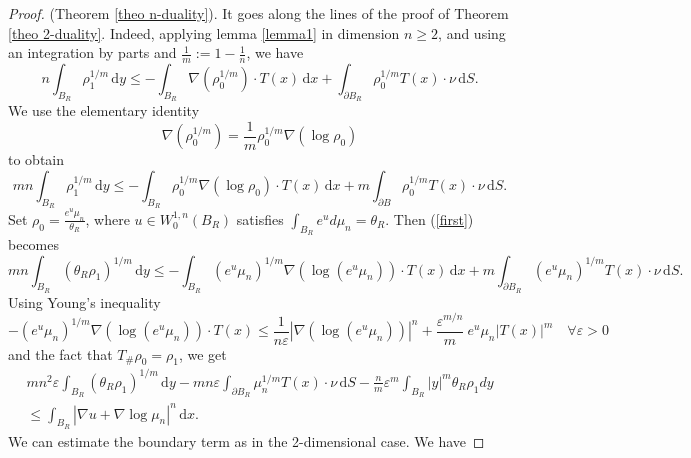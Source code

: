 \documentclass[10pt]{article}
\numberwithin{equation}{section}
\theoremstyle{plain}
\theoremstyle{definition}
\theoremstyle{remark}
\newcommand{\ib}{\int_{B_R}}
\newcommand\vep{\varepsilon}
\newcommand\dd{\,\mbox{d} }
\begin{document}
\begin{proof} (Theorem \ref{theo n-duality}). It goes along the lines of the proof of Theorem  \ref{theo 2-duality}. Indeed, applying lemma \ref{lemma1}  in dimension $n\geq 2$, and using an integration by parts and $\frac{1}{m}:=1-\frac{1}{n}$, we have
\[n\ib \rho_1 ^{1/m} \dd y \leq - \ib \nabla(\rho_0 ^{1/m}) \cdot T(x) \dd x +  \int_{\partial B_R} \rho_0 ^{1/m} T(x)\cdot\nu \dd S.\]
We use the elementary identity  
\[\nabla (\rho_0 ^{1/m})= \frac{1}{m} \rho_0 ^ {1/m} \nabla (\log \rho_0)\]
to obtain
\begin{equation}\label{first}
mn \ib \rho_1 ^{1/m}\dd y \leq - \ib \rho_0 ^{1/m}  \nabla (\log \rho_0) \cdot T(x) \dd x + m \int_{\partial B} \rho_0 ^{1/m} T(x)\cdot \nu \dd S.
\end{equation}
Set $\rho_0 = \frac{e^{u} \mu_n}{\theta_R}$, where $u\in W^{1,n}_0(B_R)$ satisfies $\ib e^{u} d\mu_n =\theta_R$. 
Then (\ref{first}) becomes
\[mn \ib (\theta_R \rho_1) ^{1/m}\dd y \leq - \ib (e^u \mu_n) ^{1/m}  \nabla (\log (e^u \mu_n)) \cdot T(x) \dd x + m \int_{\partial B_R} (e^u \mu_n) ^{1/m} T(x)\cdot \nu \dd S.\]
Using Young's inequality 
\[-\left(e^u \mu_n\right)^{1/m} \nabla \left(\log (e^u \mu_n)\right)\cdot T(x) \leq \frac{1}{n\varepsilon} |\nabla \left(\log (e^u \mu_n)\right)|^n + \frac{\varepsilon^{m/n}}{m} \ e^u \mu_n |T(x)|^m \quad \forall \vep>0\]
and the fact that $T_{\#}\rho_0=\rho_1$, we get 
\begin{eqnarray}\label{second}
mn^2\varepsilon\int_{B_R} \left(\theta_R\rho_1\right)^{1/m} \dd y -mn\varepsilon\int_{\partial B_R} \mu_n^{1/m} T(x)\cdot \nu \dd S -\frac{n}{m}\varepsilon^m\int_{B_R}|y|^m \theta_R\rho_1 dy\nonumber \\
 \leq \int_{B_R} |\nabla u +\nabla\log\mu_n|^n \dd x. \qquad \qquad \qquad \qquad
\end{eqnarray}
We can estimate the boundary term as in the 2-dimensional case. We have


\end{proof}
\end{document}
